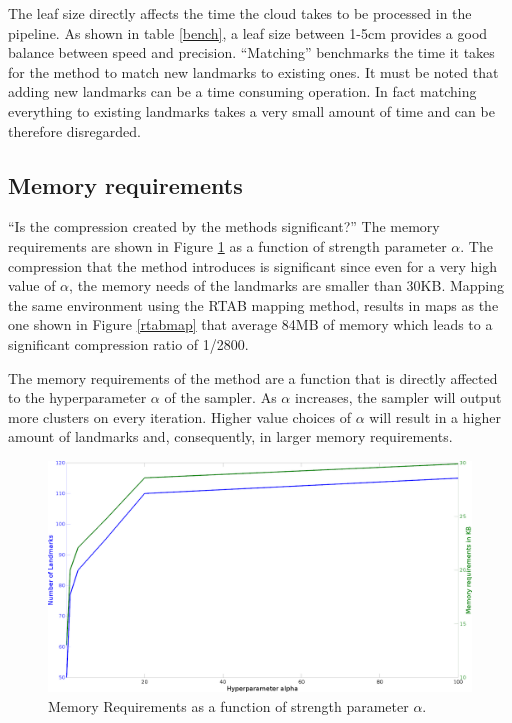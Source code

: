 \documentclass [twoside,hidelinks]{article}
\begin{document}
The leaf size directly affects the time the cloud takes to be processed in the pipeline. As shown in table \ref{bench}, a leaf size between 1-5cm provides a good balance between speed and precision. ``Matching'' benchmarks the time it takes for the method to match new landmarks to existing ones. It must be noted that adding new landmarks can be a time consuming operation. In fact matching everything to existing landmarks takes a very small amount of time and can be therefore disregarded.

\subsection{Memory requirements}
\label{reqs}
``Is the compression created by the methods significant?''
The memory requirements are shown in Figure \ref{memReq} as a function of strength parameter $\alpha$. The compression that the method introduces is significant since even for a very high value of $\alpha$, the memory needs of the landmarks are smaller than 30KB. Mapping the same environment using the RTAB mapping method, results in maps as the one shown in Figure \ref{rtabmap} that average 84MB of memory which leads to a significant compression ratio of 1/2800.

The memory requirements of the method are a function that is directly affected to the hyperparameter $\alpha$ of the sampler. As $\alpha$ increases, the sampler will output more clusters on every iteration. Higher value choices of $\alpha$ will result in a higher amount of landmarks and, consequently, in larger memory requirements.

\begin{figure} [ht!]
  \centering
    \includegraphics [width=.8\textwidth]{memoryRequirements2}
    \caption{Memory Requirements as a function of strength parameter $\alpha$.}
  \label{memReq}
\end{figure}
\end{document}
